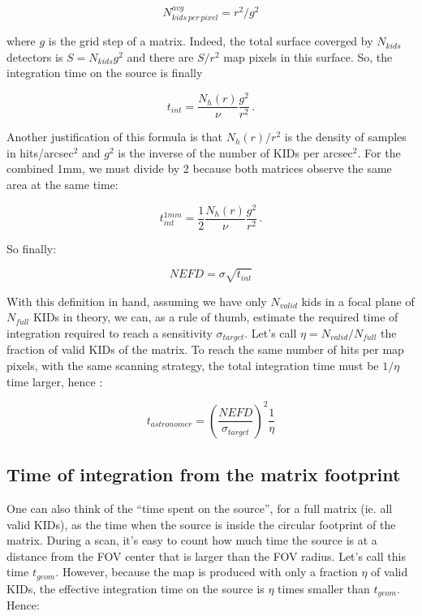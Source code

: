 \begin{equation}
N^{avg}_{kids\,per\,pixel} = r^2/g^2
\end{equation}

where $g$ is the grid step of a matrix. Indeed, the total surface coverged by
$N_{kids}$ detectors is $S = N_{kids}g^2$ and there are $S/r^2$ map pixels in
this surface. So, the integration time on the source is finally

\begin{equation}
t_{int} = \frac{N_h(r)}{\nu}\frac{g^2}{r^2}\,.
\label{eq:t_int}
\end{equation}

Another justification of this formula is that $N_h(r)/r^2$ is the density of
samples in hits/arcsec$^2$ and $g^2$ is the inverse of the number of KIDs per
arcsec$^2$. For the combined 1mm, we must divide by 2 because both matrices
observe the same area at the same time:

\begin{equation}
t^{1mm}_{int} = \frac{1}{2}\frac{N_h(r)}{\nu}\frac{g^2}{r^2}\,.
\label{eq:t_int_1mm}
\end{equation}

So finally:

\begin{equation}
NEFD = \sigma \sqrt{t_{int}}
\label{eq:nefd_t_int}
\end{equation}

With this definition in hand, assuming we have only $N_{valid}$ kids in a focal
plane of $N_{full}$ KIDs in theory, we can, as a rule of thumb, estimate
the required time of integration required to reach a sensitivity
$\sigma_{target}$. Let's call $\eta = N_{valid}/N_{full}$ the fraction of valid
KIDs of the matrix. To reach the same number of hits per map pixels, with the
same scanning strategy, the total integration time must be $1/\eta$ time larger,
hence : 

\begin{equation}
t_{astronomer} = \left(\frac{NEFD}{\sigma_{target}}\right)^2\frac{1}{\eta}
\label{eq:t_astro}
\end{equation}

\subsection{Time of integration from the matrix footprint}

One can also think of the ``time spent on the source'', for a full matrix
(ie. all valid KIDs), as the time when the source is inside the circular
footprint of the matrix. During a scan, it's easy to count how much time the
source is at a distance from the FOV center that is larger than the FOV
radius. Let's call this time $t_{geom}$. However, because the map is produced
with only a fraction $\eta$ of valid KIDs, the effective integration time on the
source is $\eta$ times smaller than $t_{geom}$. Hence:

